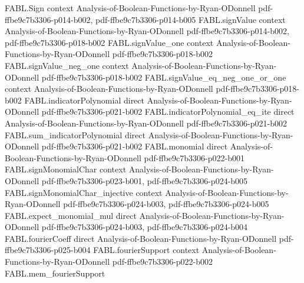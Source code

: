 \begin{theorem}
\label{FABL.exists_singletonCoeff_sq_ge_one_sub_3202_mul}
\leanok
{}
\proofstep
  {FABL.Sign}
  {context}
  {Analysis-of-Boolean-Functions-by-Ryan-ODonnell}
  {pdf-ffbe9c7b3306-p014-b002,
    pdf-ffbe9c7b3306-p014-b005}
\proofstep
  {FABL.signValue}
  {context}
  {Analysis-of-Boolean-Functions-by-Ryan-ODonnell}
  {pdf-ffbe9c7b3306-p014-b002,
    pdf-ffbe9c7b3306-p018-b002}
\proofstep
  {FABL.signValue_one}
  {context}
  {Analysis-of-Boolean-Functions-by-Ryan-ODonnell}
  {pdf-ffbe9c7b3306-p018-b002}
\proofstep
  {FABL.signValue_neg_one}
  {context}
  {Analysis-of-Boolean-Functions-by-Ryan-ODonnell}
  {pdf-ffbe9c7b3306-p018-b002}
\proofstep
  {FABL.signValue_eq_neg_one_or_one}
  {context}
  {Analysis-of-Boolean-Functions-by-Ryan-ODonnell}
  {pdf-ffbe9c7b3306-p018-b002}
\proofstep
  {FABL.indicatorPolynomial}
  {direct}
  {Analysis-of-Boolean-Functions-by-Ryan-ODonnell}
  {pdf-ffbe9c7b3306-p021-b002}
\proofstep
  {FABL.indicatorPolynomial_eq_ite}
  {direct}
  {Analysis-of-Boolean-Functions-by-Ryan-ODonnell}
  {pdf-ffbe9c7b3306-p021-b002}
\proofstep
  {FABL.sum_indicatorPolynomial}
  {direct}
  {Analysis-of-Boolean-Functions-by-Ryan-ODonnell}
  {pdf-ffbe9c7b3306-p021-b002}
\proofstep
  {FABL.monomial}
  {direct}
  {Analysis-of-Boolean-Functions-by-Ryan-ODonnell}
  {pdf-ffbe9c7b3306-p022-b001}
\proofstep
  {FABL.signMonomialChar}
  {context}
  {Analysis-of-Boolean-Functions-by-Ryan-ODonnell}
  {pdf-ffbe9c7b3306-p023-b001,
    pdf-ffbe9c7b3306-p024-b005}
\proofstep
  {FABL.signMonomialChar_injective}
  {context}
  {Analysis-of-Boolean-Functions-by-Ryan-ODonnell}
  {pdf-ffbe9c7b3306-p024-b003,
    pdf-ffbe9c7b3306-p024-b005}
\proofstep
  {FABL.expect_monomial_mul}
  {direct}
  {Analysis-of-Boolean-Functions-by-Ryan-ODonnell}
  {pdf-ffbe9c7b3306-p024-b003,
    pdf-ffbe9c7b3306-p024-b004}
\proofstep
  {FABL.fourierCoeff}
  {direct}
  {Analysis-of-Boolean-Functions-by-Ryan-ODonnell}
  {pdf-ffbe9c7b3306-p025-b004}
\proofstep
  {FABL.fourierSupport}
  {context}
  {Analysis-of-Boolean-Functions-by-Ryan-ODonnell}
  {pdf-ffbe9c7b3306-p022-b002}
\proofstep
  {FABL.mem_fourierSupport}

\end{theorem}
